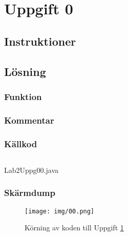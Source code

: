\section{Uppgift 0}\label{sec:uppg00}

\subsection{Instruktioner}


\subsection{Lösning}
\subsubsection{Funktion}

\subsubsection{Kommentar}


\subsubsection{Källkod}
\inputminted[linenos]{java}{src/Lab2Uppg00.java}
\caption{Lab2Uppg00.java}
\label{src:uppg00}


\subsubsection{Skärmdump}
\begin{figure}[htbp]
    \centering
        \texttt{[image: img/00.png]}
    \caption{Körning av koden till Uppgift \ref{sec:uppg00}}
    \label{fig:uppg00-screenshot}
\end{figure}

